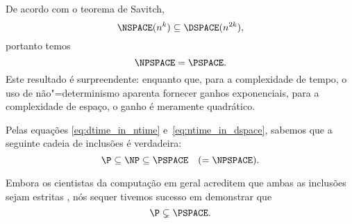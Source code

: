 De acordo com o teorema de Savitch,
\begin{equation*}
    \NSPACE(n^k) \subseteq \DSPACE(n^{2k}),
\end{equation*}
portanto temos
\begin{equation*}
    \NPSPACE = \PSPACE.
\end{equation*}
Este resultado é surpreendente:
enquanto que, para a complexidade de tempo,
o uso de não"=determinismo aparenta fornecer ganhos exponenciais,
para a complexidade de espaço,
o ganho é meramente quadrático.

Pelas equações \ref{eq:dtime_in_ntime} e~\ref{eq:ntime_in_dspace},
sabemos que a seguinte cadeia de inclusões é verdadeira:
\begin{equation*}
    \P \subseteq \NP \subseteq \PSPACE \quad (= \NPSPACE).
\end{equation*}

Embora os cientistas da computação em geral acreditem
que ambas as inclusões sejam estritas \cite[p.~54]{Gasarch2012},
nós sequer tivemos sucesso em demonstrar que
\begin{equation*}
    \P \subsetneq \PSPACE.
\end{equation*}
